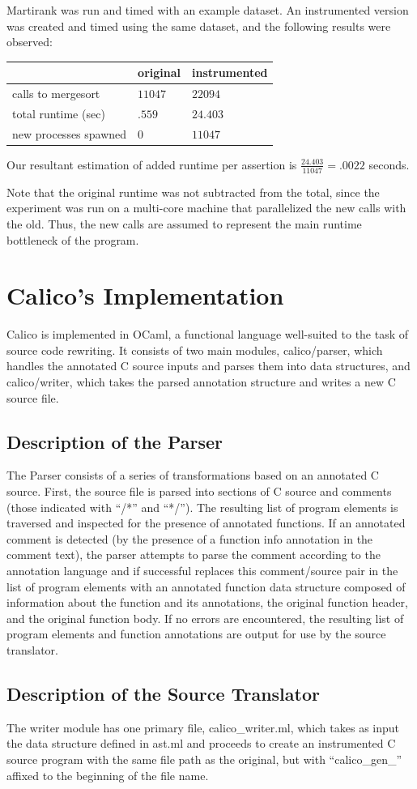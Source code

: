 \documentclass[notitlepage]{article}
\begin{document}
Martirank was run and timed with an example dataset. An instrumented version was created and timed using the same dataset, and the following results were observed:

\begin{tabular}{l | l | l}
& original & instrumented \\ \hline
calls to mergesort & $11047$ & $22094$ \\
total runtime (sec) & $.559$ & $24.403$ \\
new processes spawned & 0 & $11047$
\end{tabular}

Our resultant estimation of added runtime per assertion is $\frac{24.403}{11047} = {\mathbf .0022}$ seconds.

Note that the original runtime was not subtracted from the total, since the experiment was run on a multi-core machine that parallelized the new calls with the old. Thus, the new calls are assumed to represent the main runtime bottleneck of the program.

\section{Calico's Implementation}

Calico is implemented in OCaml, a functional language well-suited to the task of source code rewriting. It consists of two main modules, calico/parser, which handles the annotated C source inputs and parses them into data structures, and calico/writer, which takes the parsed annotation structure and writes a new C source file.

\subsection{Description of the Parser}

The Parser consists of a series of transformations based on an annotated C source. First, the source file is parsed into sections of C source and comments (those indicated with ``/*'' and ``*/''). The resulting list of program elements is traversed and inspected for the presence of annotated functions. If an annotated comment is detected (by the presence of a function info annotation in the comment text), the parser attempts to parse the comment according to the annotation language and if successful replaces this comment/source pair in the list of program elements with an annotated function data structure composed of information about the function and its annotations, the original function header, and the original function body. If no errors are encountered, the resulting list of program elements and function annotations are output for use by the source translator.

\subsection{Description of the Source Translator}

The writer module has one primary file, calico\_writer.ml, which takes as input the data structure defined in ast.ml and proceeds to create an instrumented C source program with the same file path as the original, but with ``calico\_gen\_'' affixed to the beginning of the file name.
\end{document}
